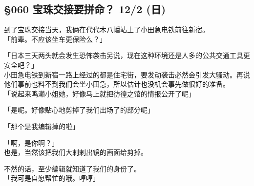 \subsection{§060 宝珠交接要拼命？ 12/2 (日)}

到了宝珠交接当天，我俩在代代木八幡站上了小田急电铁前往新宿。\\

「前辈。不应该坐车更保险么？」

「日本三天两头就会发生恐怖袭击另说，现在这种环境还是人多的公共交通工具更安全吧？」\\

小田急电铁到新宿一路上经过的都是住宅街，要发动袭击必然会引发大骚动。再说他们事前也料不到我们会坐小田急，所以估计也没机会事先做很好的准备。\\

「说起来鸣濑小姐她，好像马上就把彷徨之馆的情报公开了呢」

「是呢。好像贴心地剪掉了我们出场了的部分呢」

「那个是我编辑掉的啦」

「啊，是你啊？」\\

也是，当然该把我们大剌剌出镜的画面给剪掉。

不然的话，至少编辑就知道了我们的身份了。\\

「我可是自愿帮忙的哦。哼哼」

